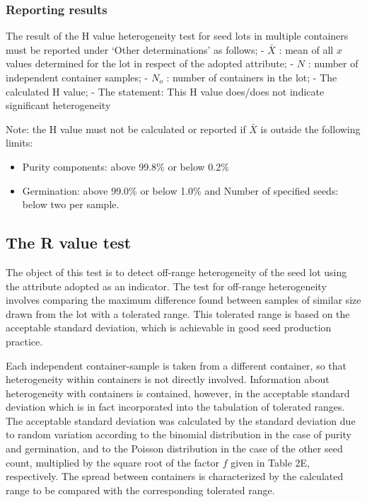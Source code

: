 \documentclass[
]{book}
\providecommand{\tightlist}{%
  \setlength{\itemsep}{0pt}\setlength{\parskip}{0pt}}
\begin{document}
\hypertarget{reporting-results}{%
\subsubsection{Reporting results}\label{reporting-results}}

The result of the H value heterogeneity test for seed lots in multiple containers must be reported under `Other determinations' as follows;
- \(\bar{X}\) : mean of all \(x\) values determined for the lot in respect of the adopted attribute;
- \(N\) : number of independent container samples;
- \(N_o\) : number of containers in the lot;
- The calculated H value;
- The statement: This H value does/does not indicate significant heterogeneity

Note: the H value must not be calculated or reported if \(\bar{X}\) is outside the following limits:

\begin{itemize}
\tightlist
\item
  Purity components: above 99.8\% or below 0.2\%
\item
  Germination: above 99.0\% or below 1.0\% and Number of specified seeds: below two per sample.
\end{itemize}

\hypertarget{the-r-value-test}{%
\subsection{The R value test}\label{the-r-value-test}}

The object of this test is to detect off-range heterogeneity of the seed lot using the attribute adopted as an indicator. The test for off-range heterogeneity involves comparing the maximum difference found between samples of similar size drawn from the lot with a tolerated range. This tolerated range is based on the acceptable standard deviation, which is achievable in good seed production practice.

Each independent container-sample is taken from a different container, so that heterogeneity within containers is not directly involved. Information about heterogeneity with containers is contained, however, in the acceptable standard deviation which is in fact incorporated into the tabulation of tolerated ranges. The acceptable standard deviation was calculated by the standard deviation due to random variation according to the binomial distribution in the case of purity and germination, and to the Poisson distribution in the case of the other seed count, multiplied by the square root of the factor \(f\) given in Table 2E, respectively. The spread between containers is characterized by the calculated range to be compared with the corresponding tolerated range.
\end{document}
